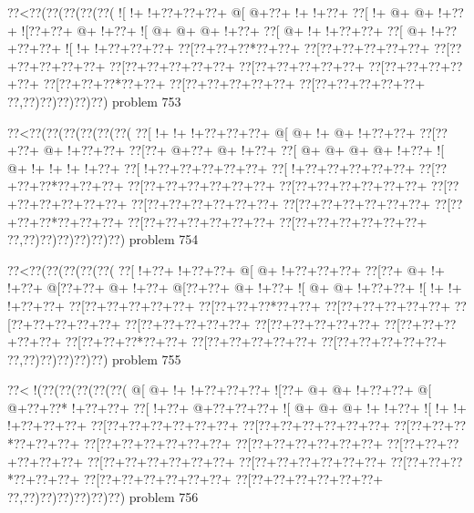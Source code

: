 \vbox{\vbox{\goo
\0??<\0??(\0??(\0??(\0??(\0??(
\- ![\- !+\- !+\0??+\0??+\0??+
\- @[\- @+\0??+\- !+\- !+\0??+
\0??[\- !+\- @+\- @+\- !+\0??+
\- ![\0??+\0??+\- @+\- !+\0??+
\- ![\- @+\- @+\- @+\- !+\0??+
\0??[\- @+\- !+\- !+\0??+\0??+
\0??[\- @+\- !+\0??+\0??+\0??+
\- ![\- !+\- !+\0??+\0??+\0??+
\0??[\0??+\0??+\0??*\0??+\0??+
\0??[\0??+\0??+\0??+\0??+\0??+
\0??[\0??+\0??+\0??+\0??+\0??+
\0??[\0??+\0??+\0??+\0??+\0??+
\0??[\0??+\0??+\0??+\0??+\0??+
\0??[\0??+\0??+\0??+\0??+\0??+
\0??[\0??+\0??+\0??*\0??+\0??+
\0??[\0??+\0??+\0??+\0??+\0??+
\0??[\0??+\0??+\0??+\0??+\0??+
\0??,\0??)\0??)\0??)\0??)\0??)
}
\hfil problem 753\hfil\break
}

\vbox{\vbox{\goo
\0??<\0??(\0??(\0??(\0??(\0??(\0??(
\0??[\- !+\- !+\- !+\0??+\0??+\0??+
\- @[\- @+\- !+\- @+\- !+\0??+\0??+
\0??[\0??+\0??+\- @+\- !+\0??+\0??+
\0??[\0??+\- @+\0??+\- @+\- !+\0??+
\0??[\- @+\- @+\- @+\- @+\- !+\0??+
\- ![\- @+\- !+\- !+\- !+\- !+\0??+
\0??[\- !+\0??+\0??+\0??+\0??+\0??+
\0??[\- !+\0??+\0??+\0??+\0??+\0??+
\0??[\0??+\0??+\0??*\0??+\0??+\0??+
\0??[\0??+\0??+\0??+\0??+\0??+\0??+
\0??[\0??+\0??+\0??+\0??+\0??+\0??+
\0??[\0??+\0??+\0??+\0??+\0??+\0??+
\0??[\0??+\0??+\0??+\0??+\0??+\0??+
\0??[\0??+\0??+\0??+\0??+\0??+\0??+
\0??[\0??+\0??+\0??*\0??+\0??+\0??+
\0??[\0??+\0??+\0??+\0??+\0??+\0??+
\0??[\0??+\0??+\0??+\0??+\0??+\0??+
\0??,\0??)\0??)\0??)\0??)\0??)\0??)
}
\hfil problem 754\hfil\break
}

\vbox{\vbox{\goo
\0??<\0??(\0??(\0??(\0??(\0??(
\0??[\- !+\0??+\- !+\0??+\0??+
\- @[\- @+\- !+\0??+\0??+\0??+
\0??[\0??+\- @+\- !+\- !+\0??+
\- @[\0??+\0??+\- @+\- !+\0??+
\- @[\0??+\0??+\- @+\- !+\0??+
\- ![\- @+\- @+\- !+\0??+\0??+
\- ![\- !+\- !+\- !+\0??+\0??+
\0??[\0??+\0??+\0??+\0??+\0??+
\0??[\0??+\0??+\0??*\0??+\0??+
\0??[\0??+\0??+\0??+\0??+\0??+
\0??[\0??+\0??+\0??+\0??+\0??+
\0??[\0??+\0??+\0??+\0??+\0??+
\0??[\0??+\0??+\0??+\0??+\0??+
\0??[\0??+\0??+\0??+\0??+\0??+
\0??[\0??+\0??+\0??*\0??+\0??+
\0??[\0??+\0??+\0??+\0??+\0??+
\0??[\0??+\0??+\0??+\0??+\0??+
\0??,\0??)\0??)\0??)\0??)\0??)
}
\hfil problem 755\hfil\break
}

\vbox{\vbox{\goo
\0??<\- !(\0??(\0??(\0??(\0??(\0??(
\- @[\- @+\- !+\- !+\0??+\0??+\0??+
\- ![\0??+\- @+\- @+\- !+\0??+\0??+
\- @[\- @+\0??+\0??*\- !+\0??+\0??+
\0??[\- !+\0??+\- @+\0??+\0??+\0??+
\- ![\- @+\- @+\- @+\- !+\- !+\0??+
\- ![\- !+\- !+\- !+\0??+\0??+\0??+
\0??[\0??+\0??+\0??+\0??+\0??+\0??+
\0??[\0??+\0??+\0??+\0??+\0??+\0??+
\0??[\0??+\0??+\0??*\0??+\0??+\0??+
\0??[\0??+\0??+\0??+\0??+\0??+\0??+
\0??[\0??+\0??+\0??+\0??+\0??+\0??+
\0??[\0??+\0??+\0??+\0??+\0??+\0??+
\0??[\0??+\0??+\0??+\0??+\0??+\0??+
\0??[\0??+\0??+\0??+\0??+\0??+\0??+
\0??[\0??+\0??+\0??*\0??+\0??+\0??+
\0??[\0??+\0??+\0??+\0??+\0??+\0??+
\0??[\0??+\0??+\0??+\0??+\0??+\0??+
\0??,\0??)\0??)\0??)\0??)\0??)\0??)
}
\hfil problem 756\hfil\break
}

